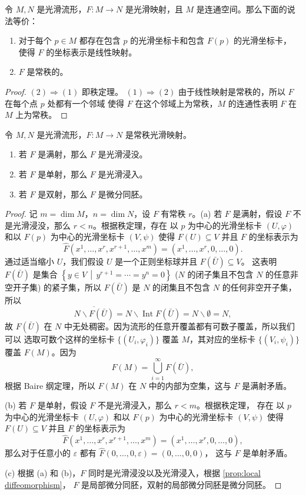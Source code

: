 \documentclass[fontset=none]{Notes}
\DeclareMathOperator\Int{Int}
\begin{document}
\begin{corollary}
  令 $M,N$ 是光滑流形，$F:M\to N$ 是光滑映射，且 $M$ 是连通空间。那么下面的说法等价：
  \begin{enumerate}
    \item 对于每个 $p\in M$ 都存在包含 $p$ 的光滑坐标卡和包含 $F(p)$ 的光滑坐标卡，
    使得 $F$ 的坐标表示是线性映射。
    \item $F$ 是常秩的。
  \end{enumerate}
\end{corollary}
\begin{proof}
  $(2)\Rightarrow (1)$ 即秩定理。
  $(1)\Rightarrow (2)$ 由于线性映射是常秩的，所以 $F$ 在每个点 $p$ 处都有一个邻域
  使得 $F$ 在这个邻域上为常秩，$M$ 的连通性表明 $F$ 在 $M$ 上为常秩。
\end{proof}

\begin{theorem}[全局秩定理]
  令 $M,N$ 是光滑流形，$F:M\to N$ 是常秩光滑映射。
  \begin{enumerate}
    \item 若 $F$ 是满射，那么 $F$ 是光滑浸没。
    \item 若 $F$ 是单射，那么 $F$ 是光滑浸入。
    \item 若 $F$ 是双射，那么 $F$ 是微分同胚。
  \end{enumerate}
\end{theorem}
\begin{proof}
  记 $m=\dim M$，$n=\dim N$，设 $F$ 有常秩 $r$。(a)
  若 $F$ 是满射，假设 $F$ 不是光滑浸没，那么 $r<n$。根据秩定理，存在
  以 $p$ 为中心的光滑坐标卡 $(U,\varphi)$ 和以 $F(p)$ 为中心的光滑坐标卡
  $(V,\psi)$ 使得 $F(U)\subseteq V$ 并且 $F$ 的坐标表示为
  \[
    \hat F\left(x^1,\dots,x^r,x^{r+1},\dots,x^m\right) =
    \left(x^1,\dots,x^r,0,\dots,0\right).
  \]
  通过适当缩小 $U$，我们假设 $U$ 是一个正则坐标球并且 $F(\bar U)\subseteq V$。
  这表明 $F(\bar U)$ 是集合 $\left\{y\in V\,\middle|\, y^{r+1}=\cdots=y^n=0\right\}$
  ($N$ 的闭子集且不包含 $N$ 的任意非空开子集) 的紧子集，所以 $F(\bar U)$ 是 $N$ 的闭集且不包含 $N$ 的任何非空开子集，
  所以
  \[
    \overline{N\smallsetminus F(\bar U)}=N\smallsetminus \Int F(\bar U)=
    N\smallsetminus\emptyset=N,
  \]
  故 $F(\bar U)$ 在 $N$ 中无处稠密。因为流形的任意开覆盖都有可数子覆盖，所以我们可以
  选取可数个这样的坐标卡 $\{(U_i,\varphi_i)\}$ 覆盖 $M$，其对应的坐标卡 $\{(V_i,\psi_i)\}$
  覆盖 $F(M)$。因为
  \[
    F(M)=\bigcup_{i=1}^\infty F(\bar U),  
  \]
  根据 Baire 纲定理，所以 $F(M)$ 在 $N$ 中的内部为空集，这与 $F$ 是满射矛盾。

  (b) 若 $F$ 是单射，假设 $F$ 不是光滑浸入，那么 $r<m$。根据秩定理，
  存在
  以 $p$ 为中心的光滑坐标卡 $(U,\varphi)$ 和以 $F(p)$ 为中心的光滑坐标卡
  $(V,\psi)$ 使得 $F(U)\subseteq V$ 并且 $F$ 的坐标表示为
  \[
    \hat F\left(x^1,\dots,x^r,x^{r+1},\dots,x^m\right) =
    \left(x^1,\dots,x^r,0,\dots,0\right),
  \]
  那么对于任意小的 $\varepsilon$ 都有 $\hat F(0,\dots,0,\varepsilon)=(0,\dots,0,0)$，
  这与 $F$ 是单射矛盾。

  (c) 根据 (a) 和 (b)，$F$ 同时是光滑浸没以及光滑浸入，根据 \autoref{prop:local diffeomorphism}，
  $F$ 是局部微分同胚，双射的局部微分同胚是微分同胚。
\end{proof}
\end{document}
